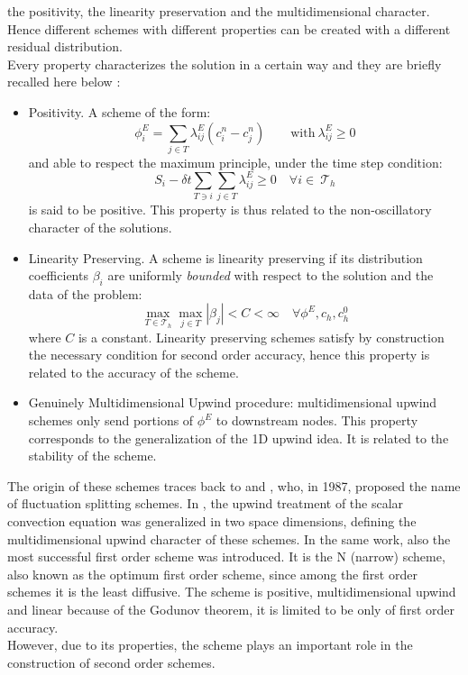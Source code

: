 the positivity, the linearity preservation and the multidimensional character.
Hence different schemes with different properties can be created with a different residual distribution. \\
Every property characterizes the solution in a certain way and they are briefly recalled here below \cite{stein_residual_2007}:
\begin{itemize}
 \item Positivity. A scheme of the form:
\begin{equation}
 \phi_i^E=\sum \limits_{j \in T} \lambda_{ij}^E(c_i^n-c_j^n) \qquad \text{with} ~\lambda_{ij}^E\ge 0
\end{equation}
and able to respect the maximum principle, under the time step condition:
\begin{equation}
 S_i -\delta t \sum \limits_{T \ni i} \sum \limits_{j \in T} \lambda_{ij}^E \ge 0 \quad \forall i \in ~\mathcal{T}_h
\end{equation}
is said to be positive. This property is thus related to the non-oscillatory character of the solutions.
\item Linearity Preserving. A scheme is linearity preserving if its distribution coefficients $\beta_i$ are uniformly \textit{bounded}
with respect to the solution and the data of the problem:
\begin{equation}
 \max\limits_{T \in \mathcal{T}_h} \max\limits_{j \in T} |\beta_j|<C<\infty \quad \forall \phi^E, c_h,c_h^0
\end{equation}
where $C$ is a constant.
Linearity preserving schemes satisfy by construction the necessary condition for second order accuracy,
hence this property is related to the accuracy of the scheme.
\item Genuinely Multidimensional Upwind procedure: multidimensional upwind schemes only send portions of $\phi^E$ to
downstream nodes. This property corresponds to the generalization of the 1D upwind idea. It is related to the stability of the scheme.
\end{itemize}
The origin of these schemes traces back to \citet{ni_multiple_1981} and \citet{roe_linear_1987}, who, in 1987, proposed the name of fluctuation splitting schemes.
In \cite{roe_linear_1987}, the upwind treatment of the scalar convection equation was generalized in two space dimensions,
defining the multidimensional upwind character of these schemes.
In the same work, also the most successful first order scheme was introduced. It is the N (narrow) scheme, also known as
the optimum first order scheme, since among the first order schemes it is the least diffusive.
The scheme is positive, multidimensional upwind and linear because of the Godunov theorem, it is limited
to be only of first order accuracy.\\
However, due to its properties, the scheme plays an important role in the construction of second order schemes. \\

